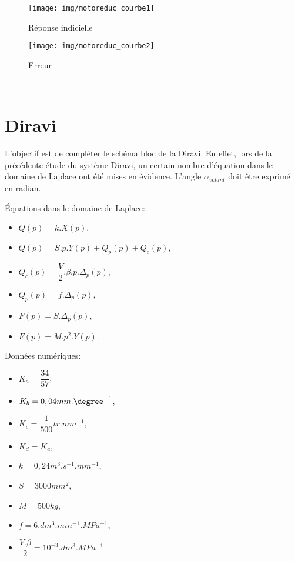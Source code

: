 \begin{figure}[!h]
 \centering\texttt{[image: img/motoreduc\_courbe1]}
 \caption{Réponse indicielle}
 \label{bloc2}
\end{figure}

\begin{figure}[!h]
 \centering\texttt{[image: img/motoreduc\_courbe2]}
 \caption{Erreur}
 \label{bloc3}
\end{figure}

~\

\newpage

\section{Diravi}

L'objectif est de compléter le schéma bloc de la Diravi. En effet, lors de la précédente étude du système Diravi, un certain nombre d'équation dans le domaine de Laplace ont été mises en évidence. L'angle $\alpha_{volant}$ doit être exprimé en radian.

\begin{minipage}{0.49\linewidth}
Équations dans le domaine de Laplace:
\begin{itemize}
 \item $Q(p)=k.X(p)$,
 \item $Q(p)=S.p.Y(p)+Q_p(p)+Q_c(p)$,
 \item $Q_c(p)=\dfrac{V}{2}.\beta.p.\Delta_p(p)$,
 \item $Q_p(p)=f.\Delta_p(p)$,
 \item $F(p)=S.\Delta_p(p)$,
 \item $F(p)=M.p^2.Y(p)$.
\end{itemize}
\end{minipage}\hfill
\begin{minipage}{0.49\linewidth}
Données numériques:
\begin{itemize}
 \item $K_a=\dfrac{34}{57}$,
 \item $K_b=0,04mm.\degree^{-1}$,
 \item $K_c=\dfrac{1}{500}tr.mm^{-1}$,
 \item $K_d=K_a$,
 \item $k=0,24m^3.s^{-1}.mm^{-1}$,
 \item $S=3000mm^2$,
 \item $M=500kg$,
 \item $f=6.dm^3.min^{-1}.MPa^{-1}$,
 \item $\dfrac{V.\beta}{2}=10^{-3}.dm^3.MPa^{-1}$
\end{itemize}
\end{minipage}

